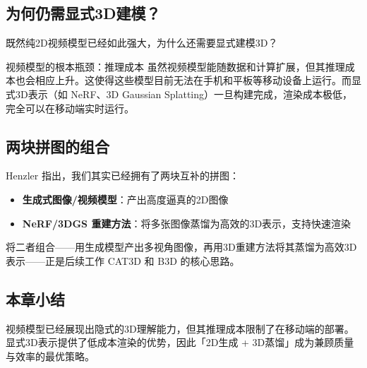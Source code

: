 \subsection{为何仍需显式3D建模？}

既然纯2D视频模型已经如此强大，为什么还需要显式建模3D？

\begin{warningbox}{视频模型的根本瓶颈：推理成本}
虽然视频模型能随数据和计算扩展，但其推理成本也会相应上升。这使得这些模型目前无法在手机和平板等移动设备上运行。而显式3D表示（如 NeRF、3D Gaussian Splatting）一旦构建完成，渲染成本极低，完全可以在移动端实时运行。
\end{warningbox}

\subsection{两块拼图的组合}

Henzler 指出，我们其实已经拥有了两块互补的拼图：

\begin{itemize}
    \item \textbf{生成式图像/视频模型}：产出高度逼真的2D图像
    \item \textbf{NeRF/3DGS 重建方法}：将多张图像蒸馏为高效的3D表示，支持快速渲染
\end{itemize}

将二者组合——用生成模型产出多视角图像，再用3D重建方法将其蒸馏为高效3D表示——正是后续工作 CAT3D 和 B3D 的核心思路。

\subsection{本章小结}

视频模型已经展现出隐式的3D理解能力，但其推理成本限制了在移动端的部署。显式3D表示提供了低成本渲染的优势，因此「2D生成 + 3D蒸馏」成为兼顾质量与效率的最优策略。

